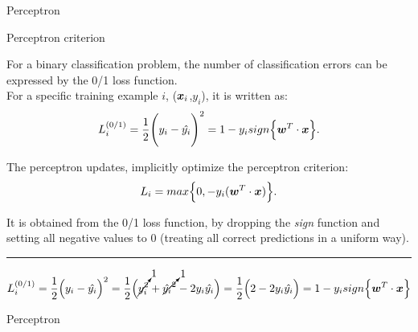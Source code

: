 %
%
%

\begin{frame}[t]{Perceptron}


\end{frame}

%
%
%

\begin{frame}[t]{Perceptron criterion}

    For a binary classification problem, 
    the number of classification errors can be expressed by the
    \gls{0/1 loss function}.\\
    \vspace{0.3cm}
    For a specific training example $i$, 
    ($\boldsymbol{x}_i$,$y_i$), it is written as:
    \begin{equation}
        L_{i}^{(0/1)} = 
          \frac{1}{2} \Bigg( y_i - \hat{y_i} \Bigg)^2 =
          1 - y_i sign\Big\{ \boldsymbol{w}^T \cdot \boldsymbol{x} \Big\}.
        \label{eq:percepton_01_loss_1}  
    \end{equation}

    The \gls{perceptron} updates, 
    implicitly optimize the \gls{perceptron criterion}:
    \begin{equation}
        L_{i} = 
          max\Big\{0, - y_i(\boldsymbol{w}^T \cdot \boldsymbol{x}) \Big\}.
        \label{eq:percepton_criterion_1}  
    \end{equation}

    It is obtained from the \gls{0/1 loss function}, 
    by dropping the {\em sign} function and setting all negative values to 0
    (treating all correct predictions in a uniform way).

    \noindent\rule{4cm}{0.4pt}
    {\scriptsize
        \begin{equation*}
            L_{i}^{(0/1)} = 
            \frac{1}{2} \Big( y_i - \hat{y_i} \Big)^2 =
            \frac{1}{2} \Big( \cancelto{1}{y_i^2} + \cancelto{1}{\hat{y_i}^2} - 2 y_i \hat{y_i} \Big) =          
            \frac{1}{2} \Big( 2 - 2 y_i \hat{y_i} \Big) = 
            1 - y_i sign\Big\{ \boldsymbol{w}^T \cdot \boldsymbol{x} \Big\}
        \end{equation*}     
    }
    
\end{frame}

%
%
%

\begin{frame}[t]{Perceptron}


\end{frame}





